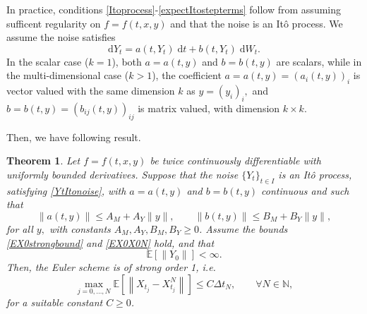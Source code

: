 \documentclass[reqno,12pt]{amsart}
\theoremstyle{plain} %
\newtheorem{theorem}{Theorem}[section]
\theoremstyle{definition} %
\begin{document}
In practice, conditions \eqref{Itoprocess}-\eqref{expectItostepterms} follow from assuming sufficent regularity on $f=f(t, x, y)$ and that the noise is an It\^o process. We assume the noise satisfies
\begin{equation}
    \label{YtItonoise}
    \mathrm{d}Y_t = a(t, Y_t)\;\mathrm{d}t + b(t, Y_t)\;\mathrm{d}W_t.
\end{equation}
In the scalar case ($k=1$), both $a=a(t, y)$ and $b=b(t, y)$ are scalars, while in the multi-dimensional case ($k > 1$), the coefficient $a = a(t, y) = (a_i(t, y))_i$ is vector valued with the same dimension $k$ as $y=(y_i)_i,$ and $b=b(t, y) = (b_{ij}(t, y))_{ij}$ is matrix valued, with dimension $k\times k$.

Then, we have following result.
\begin{theorem}
    \label{thmItonoise}
    Let $f=f(t, x, y)$ be twice continuously differentiable with uniformly bounded derivatives. Suppose that the noise $\{Y_t\}_{t\in I}$ is an It\^o process, satisfying \eqref{YtItonoise}, with $a=a(t, y)$ and $b=b(t, y)$ continuous and such that
    \begin{equation}
        \label{Itonoiseterms}
        \|a(t, y)\| \leq A_M + A_Y \|y\|, \qquad \|b(t, y)\| \leq B_M + B_Y\|y\|,
    \end{equation}
    for all $y,$ with constants $A_M, A_Y, B_M, B_Y \geq 0$.
    Assume the bounds \eqref{EX0strongbound} and \eqref{EX0X0N} hold, and that
    \begin{equation}
        \label{YtItonoiseinitialcondition}
        \mathbb{E}[\|Y_0\|] < \infty.
    \end{equation}
    Then, the Euler scheme is of strong order 1, i.e.
    \begin{equation}
        \max_{j=0, \ldots, N}\mathbb{E}\left[ \left\| X_{t_j} - X_{t_j}^N \right\| \right] \leq C \Delta t_N, \qquad \forall N \in \mathbb{N},
    \end{equation}
  for a suitable constant $C \geq 0$.
\end{theorem}
\end{document}
